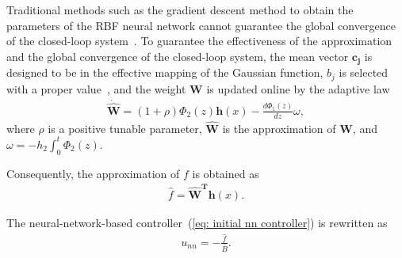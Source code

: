 \documentclass{ifacconf}
\begin{document}

Traditional methods such as the gradient descent method to obtain the parameters of the RBF neural network cannot guarantee the global convergence of the closed-loop system~\citep{cuong2018adaptive}. To guarantee the effectiveness of the approximation and the global convergence of the closed-loop system, the mean vector $\bm{c_j}$ is designed to be in the effective mapping of the Gaussian function, $b_j$ is selected with a proper value~\citep{jinkun2013radial}, and the weight $\bm{W}$ is updated online by the adaptive law
\begin{align}\label{eq:adaptive law}
  \bm{ \dot{\hat{W}}}=(1+\rho)\Phi_2(z)\bm{h}(x)-\frac{d \Phi_1(z)}{dz} \omega,
\end{align}
where $\rho$ is a positive tunable parameter, $\bm{\hat{W}}$ is the approximation of $\bm{W}$, and $\omega=-h_2 \int_0^t \Phi_2(z)$.

Consequently, the approximation of $f$ is obtained as
\begin{align}
    \hat{f}=\bm{\hat{W}}^{\bm{T}} \bm{h}(x).
\end{align}

The neural-network-based controller~(\ref{eq: initial nn controller}) is rewritten as
\begin{align}
    u_{nn}=-\frac{\hat{f}}{\bar{B}}.
\end{align}
\end{document}
